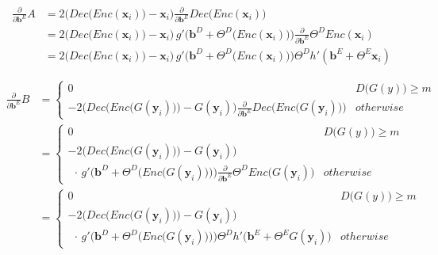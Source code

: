 \[
    \begin{split}
        \frac{\partial}{\partial \mathbf{b}^{E}} A
        & = 2 \Big(Dec\big(Enc(\mathbf{x}_i)\big) - \mathbf{x}_{i}\Big) \frac{\partial}{\partial \mathbf{b}^{E}}  Dec\big(Enc(\mathbf{x}_i)\big) \\[10pt]
        & = 2 \Big(Dec\big(Enc(\mathbf{x}_i)\big) - \mathbf{x}_{i}\Big) \, g'\Big(\mathbf{b}^{D} + \Theta^{D}\big(Enc(\mathbf{x}_{i})\big)\Big) \frac{\partial}{\partial \mathbf{b}^{E}} \Theta^{D} Enc(\mathbf{x}_{i})\\[10pt]
        & = 2 \Big(Dec\big(Enc(\mathbf{x}_i)\big) - \mathbf{x}_{i}\Big) \, g'\Big(\mathbf{b}^{D} + \Theta^{D}\big(Enc(\mathbf{x}_{i})\big)\Big) \Theta^{D} h'(\mathbf{b}^{E} + \Theta^{E}\mathbf{x}_{i})
    \end{split}
\]

\vspace{10pt}

\[
    \begin{split}
        \frac{\partial}{\partial \mathbf{b}^{E}} B
        & =
        \begin{cases}
            0 & D\big(G(y)\big) \geq m \\
            - 2 \bigg(Dec\Big(Enc\big(G(\mathbf{y}_i)\big)\Big) - G(\mathbf{y}_{i})\bigg) \frac{\partial}{\partial \mathbf{b}^{E}} Dec\Big(Enc\big(G(\mathbf{y}_i)\big)\Big) & otherwise
        \end{cases} \\[10pt]
        & =
        \begin{cases}
            0 & D\big(G(y)\big) \geq m \\
            - 2 \bigg(Dec\Big(Enc\big(G(\mathbf{y}_i)\big)\Big) - G(\mathbf{y}_{i})\bigg) \, \\ \;\, \cdot \, g'\bigg(\mathbf{b}^{D} + \Theta^{D}\Big(Enc\big(G(\mathbf{y}_{i})\big)\Big)\bigg) \frac{\partial}{\partial \mathbf{b}^{E}} \Theta^{D} Enc\big(G(\mathbf{y}_{i})\big)& otherwise
        \end{cases}\\[10pt]
        & = 
        \begin{cases}
            0 & D\big(G(y)\big) \geq m \\
            - 2 \bigg(Dec\Big(Enc\big(G(\mathbf{y}_i)\big)\Big) - G(\mathbf{y}_{i})\bigg) \, \\ \;\, \cdot \, g'\bigg(\mathbf{b}^{D} + \Theta^{D}\Big(Enc\big(G(\mathbf{y}_{i})\big)\Big)\bigg) \Theta^{D} h'\big(\mathbf{b}^{E} + \Theta^{E}G(\mathbf{y}_{i})\big) & otherwise
        \end{cases}
    \end{split}
\]

